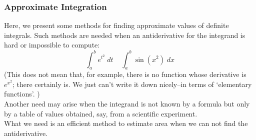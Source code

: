 \begin{frame}
\frametitle{Approximate Integration}

Here, we present some methods
for finding approximate values of definite integrals.  Such methods are
needed when an antiderivative for the integrand is hard or impossible 
to compute:
\[
\int_a^b e^{t^2}\; dt \;\;\;\;\int_a^b \sin(x^2)\;dx
\]
(This does not mean that, for example, there is 
no function whose derivative is $e^{x^2}$;  there certainly is.
 We just can't write it down nicely--in terms of `elementary functions'. 
)\\
Another need may arise when the integrand is not known by a formula but only by a
table of values obtained, say, from a scientific experiment.\\

What we need is an efficient method to estimate area when we 
can not find the antiderivative.

\end{frame}

